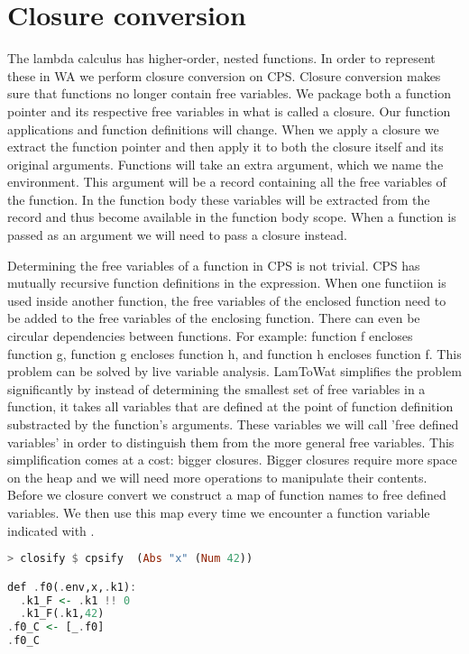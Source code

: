 \section{\label{section:closconvert}Closure conversion}
The lambda calculus has higher-order, nested functions. In order to represent these in \ac{WA} we perform closure conversion on \ac{CPS}. Closure conversion makes sure that functions no longer contain free variables. We package both a function pointer and its respective free variables in what is called a closure. Our function applications and function definitions will change. When we apply a closure we extract the function pointer and then apply it to both the closure itself and its original arguments. Functions will take an extra argument, which we name the environment. This argument will be a record containing all the free variables of the function. In the function body these variables will be extracted from the record and thus become available in the function body scope. When a function is passed as an argument we will need to pass a closure instead.

Determining the free variables of a function in \ac{CPS} is not trivial. \ac{CPS} has mutually recursive function definitions in the  expression. When one functiion is used inside another function, the free variables of the enclosed function need to be added to the free variables of the enclosing function. There can even be circular dependencies between functions. For example: function f encloses function g, function g encloses function h, and function h encloses function f. This problem can be solved by live variable analysis\autocite{DBLP:books/aw/AhoSU86}. LamToWat simplifies the problem significantly by instead of determining the smallest set of free variables in a function, it takes all variables that are defined at the point of function definition substracted by the function's arguments. These variables we will call 'free defined variables' in order to distinguish them from the more general free variables. This simplification comes at a cost: bigger closures. Bigger closures require more space on the heap and we will need more operations to manipulate their contents. Before we closure convert we construct a map of function names to free defined variables. We then use this map every time we encounter a function variable indicated with .

\begin{lstlisting}[language=Haskell]
> closify $ cpsify  (Abs "x" (Num 42))

def .f0(.env,x,.k1):
  .k1_F <- .k1 !! 0
  .k1_F(.k1,42)
.f0_C <- [_.f0]
.f0_C
\end{lstlisting}

